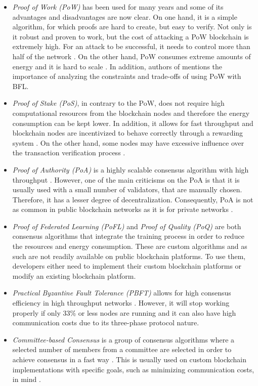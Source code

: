 \begin{itemize}
    \item \textit{Proof of Work (PoW)} has been used for many years and some of its advantages and disadvantages are now clear. On one hand, it is a simple algorithm, for which proofs are hard to create, but easy to verify. Not only is it robust and proven to work, but the cost of attacking a PoW blockchain is extremely high. For an attack to be successful, it needs to control more than half of the network \cite{li_blockchain_2021}. On the other hand, PoW consumes extreme amounts of energy and it is hard to scale \cite{edwood_2020, li_blockchain_2021, ccaf}. In addition, authors of \cite{10.48550/arxiv.2112.07938} mentions the importance of analyzing the constraints and trade-offs of using PoW with BFL.

    \item \textit{Proof of Stake (PoS)}, in contrary to the PoW, does not require high computational resources from the blockchain nodes and therefore the energy consumption can be kept lower. In addition, it allows for fast throughput and blockchain nodes are incentivized to behave correctly through a rewarding system \cite{li_blockchain_2021}. On the other hand, some nodes may have excessive influence over the transaction verification process \cite{li_blockchain_2021}.
    
    \item \textit{Proof of Authority (PoA)} is a highly scalable consensus algorithm with high throughput \cite{binance_academy_2020}. However, one of the main criticisms on the PoA is that it is usually used with a small number of validators, that are manually chosen. Therefore, it has a lesser degree of decentralization. Consequently, PoA is not as common in public blockchain networks as it is for private networks \cite{bPoA}.

    \item \textit{Proof of Federated Learning (PoFL)} \cite{9347812, 10.48550/arxiv.2007.15145} and \textit{Proof of Quality (PoQ)} \cite{8843900} are both consensus algorithms that integrate the training process in order to reduce the resources and energy consumption. These are custom algorithms and as such are not readily available on public blockchain platforms. To use them, developers either need to implement their custom blockchain platforms or modify an existing blockchain platform.

    \item \textit{Practical Byzantine Fault Tolerance (PBFT)} allows for high consensus efficiency in high throughput networks \cite{li_blockchain_2021}. However, it will stop working properly if only 33\% or less nodes are running and it can also have high communication costs due to its three-phase protocol nature.

    \item \textit{Committee-based Consensus} is a group of consensus algorithms where a selected number of members from a committee are selected in order to achieve consensus in a fast way \cite{qu_blockchain-enabled_2022}. This is usually used on custom blockchain implementations with specific goals, such as minimizing communication costs, in mind \cite{9293091}.
\end{itemize}
